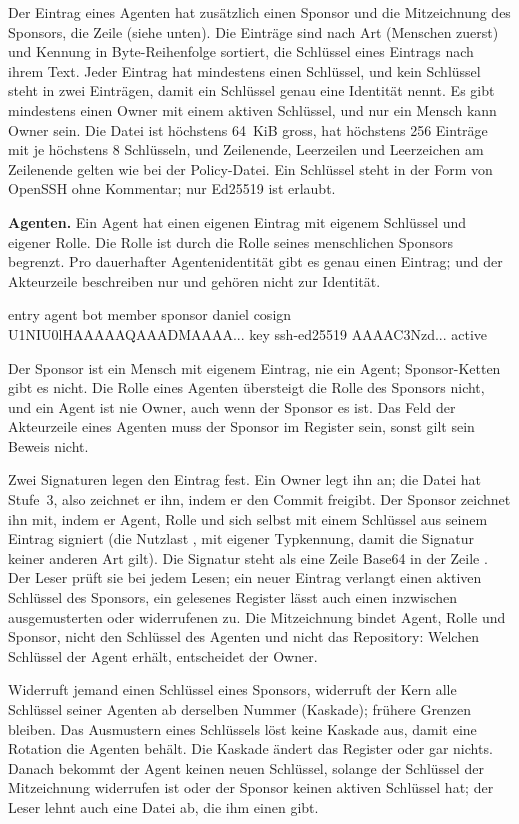 Der Eintrag eines Agenten hat zusätzlich einen Sponsor und die Mitzeichnung des Sponsors,
die Zeile  (siehe unten).
Die Einträge sind nach Art (Menschen zuerst) und Kennung in Byte-Reihenfolge sortiert,
die Schlüssel eines Eintrags nach ihrem Text.
Jeder Eintrag hat mindestens einen Schlüssel, und kein Schlüssel steht in zwei Einträgen,
damit ein Schlüssel genau eine Identität nennt.
Es gibt mindestens einen Owner mit einem aktiven Schlüssel, und nur ein Mensch kann Owner sein.
Die Datei ist höchstens 64~KiB gross, hat höchstens 256 Einträge mit je höchstens 8 Schlüsseln,
und Zeilenende, Leerzeilen und Leerzeichen am Zeilenende gelten wie bei der Policy-Datei.
Ein Schlüssel steht in der Form von OpenSSH ohne Kommentar; nur Ed25519 ist erlaubt.

{\bf Agenten.}
Ein Agent hat einen eigenen Eintrag mit eigenem Schlüssel und eigener Rolle.
Die Rolle ist durch die Rolle seines menschlichen Sponsors begrenzt.
Pro dauerhafter Agentenidentität gibt es genau einen Eintrag;
 und  der Akteurzeile beschreiben nur und gehören nicht zur Identität.

\starttyping
entry agent bot member sponsor daniel
cosign U1NIU0lHAAAAAQAAADMAAAA...
key ssh-ed25519 AAAAC3Nzd... active
\stoptyping

Der Sponsor ist ein Mensch mit eigenem Eintrag, nie ein Agent; Sponsor-Ketten gibt es nicht.
Die Rolle eines Agenten übersteigt die Rolle des Sponsors nicht, und ein Agent ist nie Owner,
auch wenn der Sponsor es ist.
Das Feld  der Akteurzeile eines Agenten muss der Sponsor im Register sein,
sonst gilt sein Beweis nicht.

Zwei Signaturen legen den Eintrag fest.
Ein Owner legt ihn an; die Datei hat Stufe~3, also zeichnet er ihn, indem er den Commit freigibt.
Der Sponsor zeichnet ihn mit, indem er Agent, Rolle und sich selbst
mit einem Schlüssel aus seinem Eintrag signiert (die Nutzlast ,
mit eigener Typkennung, damit die Signatur keiner anderen Art gilt).
Die Signatur steht als eine Zeile Base64 in der Zeile .
Der Leser prüft sie bei jedem Lesen; ein neuer Eintrag verlangt einen aktiven Schlüssel
des Sponsors, ein gelesenes Register lässt auch einen inzwischen ausgemusterten
oder widerrufenen zu.
Die Mitzeichnung bindet Agent, Rolle und Sponsor, nicht den Schlüssel des Agenten
und nicht das Repository: Welchen Schlüssel der Agent erhält, entscheidet der Owner.

Widerruft jemand einen Schlüssel eines Sponsors, widerruft der Kern
alle Schlüssel seiner Agenten ab derselben Nummer (Kaskade); frühere Grenzen bleiben.
Das Ausmustern eines Schlüssels löst keine Kaskade aus, damit eine Rotation die Agenten behält.
Die Kaskade ändert das Register oder gar nichts.
Danach bekommt der Agent keinen neuen Schlüssel, solange der Schlüssel der Mitzeichnung widerrufen
ist oder der Sponsor keinen aktiven Schlüssel hat; der Leser lehnt auch eine Datei ab,
die ihm einen gibt.

